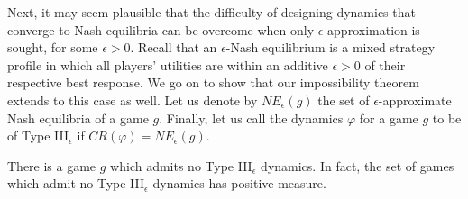 \documentclass[11pt]{article}
\begin{document}
Next, it may seem plausible that the difficulty of designing dynamics that converge to Nash equilibria can be overcome when only $\epsilon$-approximation is sought, for some $\epsilon>0$.  Recall that an $\epsilon$-Nash equilibrium is a mixed strategy profile in which all players' utilities are within an additive $\epsilon>0$ of their respective best response. We go on to show that our impossibility theorem extends to this case as well. Let us denote by $NE_\epsilon(g)$ the set of $\epsilon$-approximate Nash equilibria of a game $g$. Finally, let us call the dynamics $\varphi$ for a game $g$ to be of Type III$_\epsilon$ if $CR(\varphi)=NE_{\epsilon}(g)$.

\begin{theorem}
There is a game $g$ which admits no Type III$_\epsilon$ dynamics.
In fact, the set of games which admit no Type III$_\epsilon$ dynamics has positive measure.
\end{theorem}
\end{document}
